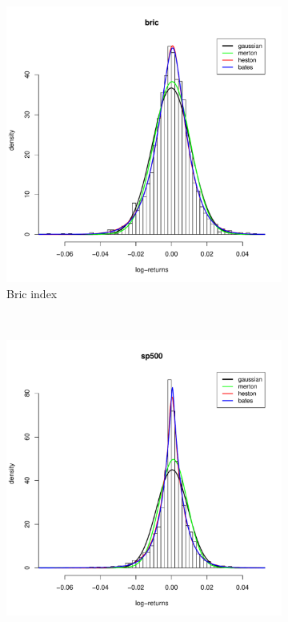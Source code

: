 \begin{figure}
\begin{subfigure}{0.44\textwidth}
		\includegraphics[width=\linewidth]{Images/hist_bric.pdf}
		\caption{Bric index}
	\end{subfigure}
	\\
	\begin{subfigure}{0.44\textwidth}
		\centering
		\includegraphics[width=\linewidth]{Images/hist_sp500.pdf}

\end{subfigure}
\end{figure}
